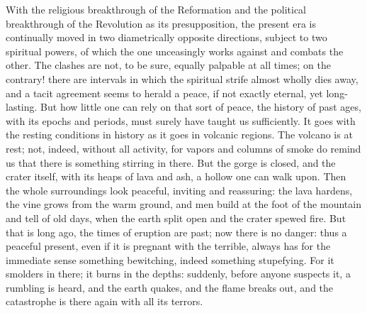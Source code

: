 \documentclass[12pt]{book}
\newcommand{\opage}[1]{\marginnote{\footnotesize\textit{[#1]}}}
\begin{document}
With the religious breakthrough of the Reformation and the political
breakthrough of the Revolution as its presupposition, the present era is
continually moved in two diametrically opposite directions, subject to
two spiritual powers, of which the one
unceasingly works against and combats the other. The clashes are not, to
be sure, equally palpable at all times; on the contrary! there are
intervals in which the spiritual strife almost wholly dies away, and a
tacit agreement seems to herald a peace, if not exactly eternal, yet
long-lasting. But how little one can rely on that sort of peace, the
history of past ages, with its epochs and periods, must surely have
taught us sufficiently. It goes with the resting conditions in history as
it goes in volcanic regions. The volcano is at rest; not, indeed,
without all activity, for vapors and columns of smoke do remind us that
there is something stirring in there. But the gorge is closed, and the
crater itself, with its heaps of lava and ash, a hollow one can walk
upon. Then the whole surroundings look peaceful, inviting and reassuring:
the lava hardens, the vine grows from the warm ground, and men build at
the foot of the mountain and tell of old days, when the earth split open
and the crater spewed fire. But that is long ago, the times of eruption
are past; now there is no danger: thus a peaceful present, even if it is
pregnant with the terrible, always has for the immediate sense something
bewitching, indeed something stupefying. For it smolders in there; it
burns
\opage{38}\setcounter{footnote}{0}%
in the depths: suddenly, before anyone suspects it, a rumbling is heard,
and the earth quakes, and the flame breaks out, and the catastrophe is
there again with all its terrors.
\end{document}
